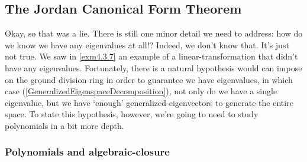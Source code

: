 \subsection{The Jordan Canonical Form Theorem}

Okay, so that was a lie.  There is still one minor detail we need to address:  how do we know we have any eigenvalues at all!?  Indeed, we don't know that.  It's just not true.  We saw in \cref{exm4.3.7} an example of a linear-transformation that didn't have any eigenvalues.  Fortunately, there is a natural hypothesis would can impose on the ground division ring in order to guarantee we have eigenvalues, in which case (\cref{GeneralizedEigenspaceDecomposition}), not only do we have a single eigenvalue, but we have `enough' generalized-eigenvectors to generate the entire space.  To state this hypothesis, however, we're going to need to study polynomials in a bit more depth.

\subsubsection{Polynomials and algebraic-closure}

